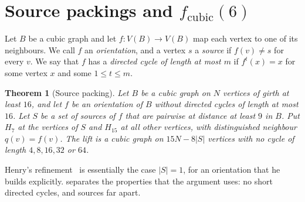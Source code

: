 \documentclass[11pt]{amsart}
\newtheorem{theorem}{Theorem}[section]
\theoremstyle{definition}
\theoremstyle{remark}
\newcommand{\fc}{f_{\mathrm{cubic}}}
\newcommand{\Hseven}{H_7}
\newcommand{\Hfifteen}{H_{15}}
\begin{document}
\section{Source packings and $\fc(6)$}\label{sec:packing}

Let $B$ be a cubic graph and let $f\colon V(B)\to V(B)$ map each vertex to one
of its neighbours. We call $f$ an \emph{orientation}, and a vertex $s$ a
\emph{source} if $f(v)\ne s$ for every $v$. We say that $f$ has a
\emph{directed cycle of length at most $m$} if $f^t(x)=x$ for some vertex $x$
and some $1\le t\le m$.

\begin{theorem}[Source packing]\label{thm:packing}
Let $B$ be a cubic graph on $N$ vertices of girth at least $16$, and let $f$ be
an orientation of $B$ without directed cycles of length at most $16$. Let $S$ be
a set of sources of $f$ that are pairwise at distance at least $9$ in $B$. Put
$\Hseven$ at the vertices of $S$ and $\Hfifteen$ at all other vertices, with
distinguished neighbour $q(v)=f(v)$. The lift is a cubic graph on $15N-8|S|$
vertices with no cycle of length $4,8,16,32$ or $64$.
\end{theorem}

Henry's refinement~\cite[Theorem~5.2]{Henry2026} is essentially the case
$|S|=1$, for an orientation that he builds explicitly. 
separates the properties that the argument uses: no short directed cycles, and
sources far apart.
\end{document}
